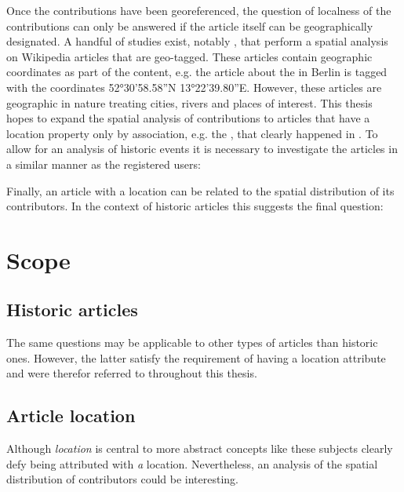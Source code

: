 Once the contributions have been georeferenced, the question of localness of the contributions can only be answered if the article itself can be geographically designated. 
A handful of studies exist, notably \cite{hardy2011volunteered,hecht2010localness}, that perform a spatial analysis on Wikipedia articles that are geo-tagged.
These articles contain geographic coordinates as part of the content, e.g. the article about the  in Berlin is tagged with the coordinates 52°30'58.58''N 13°22'39.80''E.
However, these articles are geographic in nature treating cities, rivers and places of interest. 
This thesis hopes to expand the spatial analysis of contributions to articles that have a location property only by association, e.g. the , that clearly happened in .
To allow for an analysis of historic events it is necessary to investigate the articles in a similar manner as the registered users:


Finally, an article with a location can be related to the spatial distribution of its contributors.
In the context of historic articles this suggests the final question:


\section{Scope}

\subsection{Historic articles}
The same questions may be applicable to other types of articles than historic ones.
However, the latter satisfy the requirement of having a location attribute and were therefor referred to throughout this thesis.

\subsection{Article location}
Although \emph{location} is central to more abstract concepts like  these subjects clearly defy being attributed with \emph{a} location.
Nevertheless, an analysis of the spatial distribution of contributors could be interesting. 
